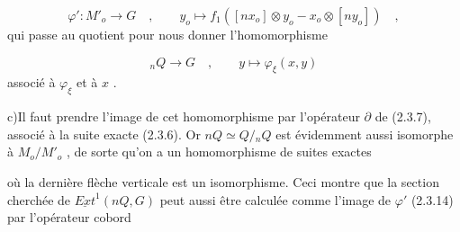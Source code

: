 \begin{equation}\tag{2.3.14}
\varphi' : M'_o \longrightarrow G \quad , \qquad y_o \longmapsto f_1([nx_o] \otimes y_o - x_o \otimes [ny_o]) \quad ,
\end{equation}
qui passe au quotient pour nous donner l'homomorphisme

\begin{equation*}
{}_nQ \longrightarrow G \quad , \qquad y \longmapsto \varphi_{\xi}(x,y)
\end{equation*}
associé à $\varphi_{\xi}$ et à $x$ .

c)\quad Il faut prendre l'image de cet homomorphisme par l'opérateur $\partial$ de (2.3.7), associé à la suite exacte (2.3.6). Or $nQ \simeq Q/{}_nQ$ est évidemment aussi isomorphe à $M_o/M'_o$ , de sorte qu'on a un homomorphisme de suites exactes 


\begin{center}
\end{center}
 où la dernière flèche verticale est un isomorphisme. Ceci montre que la section cherchée de $\underline{Ext}^1(nQ,G)$ peut aussi être calculée comme l'image de $\varphi'$ (2.3.14) par l'opérateur cobord

